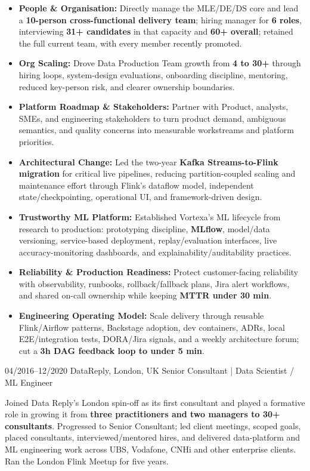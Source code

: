\documentclass[]{../../friggeri-cv}
\begin{document}
\begin{entrylist}
{{        }
        \begin{itemize}[leftmargin=1.1em]
            \item \footnotesize\textbf{People \& Organisation:} Directly manage the MLE/DE/DS core and lead a \textbf{10-person cross-functional delivery team}; hiring manager for \textbf{6 roles}, interviewing \textbf{31+ candidates} in that capacity and \textbf{60+ overall}; retained the full current team, with every member recently promoted.
            \item \footnotesize\textbf{Org Scaling:} Drove Data Production Team growth from \textbf{4 to 30+} through hiring loops, system-design evaluations, onboarding discipline, mentoring, reduced key-person risk, and clearer ownership boundaries.
            \item \footnotesize\textbf{Platform Roadmap \& Stakeholders:} Partner with Product, analysts, SMEs, and engineering stakeholders to turn product demand, ambiguous semantics, and quality concerns into measurable workstreams and platform priorities.
            \item \footnotesize\textbf{Architectural Change:} Led the two-year \textbf{Kafka Streams-to-Flink migration} for critical live pipelines, reducing partition-coupled scaling and maintenance effort through Flink's dataflow model, independent state/checkpointing, operational UI, and framework-driven design.
            \item \footnotesize\textbf{Trustworthy ML Platform:} Established Vortexa's ML lifecycle from research to production: prototyping discipline, \textbf{MLflow}, model/data versioning, service-based deployment, replay/evaluation interfaces, live accuracy-monitoring dashboards, and explainability/auditability practices.
            \item \footnotesize\textbf{Reliability \& Production Readiness:} Protect customer-facing reliability with observability, runbooks, rollback/fallback plans, Jira alert workflows, and shared on-call ownership while keeping \textbf{MTTR under 30 min}.
            \item \footnotesize\textbf{Engineering Operating Model:} Scale delivery through reusable Flink/Airflow patterns, Backstage adoption, dev containers, ADRs, local E2E/integration tests, DORA/Jira signals, and a weekly architecture forum; cut a \textbf{3h DAG feedback loop to under 5 min}.
        \end{itemize}
    }
    \entry
    {04/2016--12/2020}
    {DataReply, London, UK}
    {Senior Consultant | Data Scientist / ML Engineer}
    {
        {\small
        \setlength{\parindent}{0pt}
        \setlength{\leftskip}{0pt}
        Joined Data Reply's London spin-off as its first consultant and played a formative role in growing it from \textbf{three practitioners and two managers to 30+ consultants}. Progressed to Senior Consultant; led client meetings, scoped goals, placed consultants, interviewed/mentored hires, and delivered data-platform and ML engineering work across UBS, Vodafone, CNHi and other enterprise clients. Ran the London Flink Meetup for five years.

}}
\end{entrylist}
\end{document}
